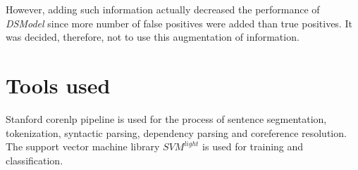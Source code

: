 However, adding such information actually decreased the performance of \textit{DSModel} since more number of false positives were added than true positives. It was decided, therefore, not to use this augmentation of information.


\section{Tools used}\label{sec:tools}

Stanford corenlp pipeline \cite{manning2014stanford} is used for the process of sentence segmentation, tokenization, syntactic parsing, dependency parsing and coreference resolution. The support vector machine library $SVM^{light}$ \cite{joachims1999making} is used for training and classification.